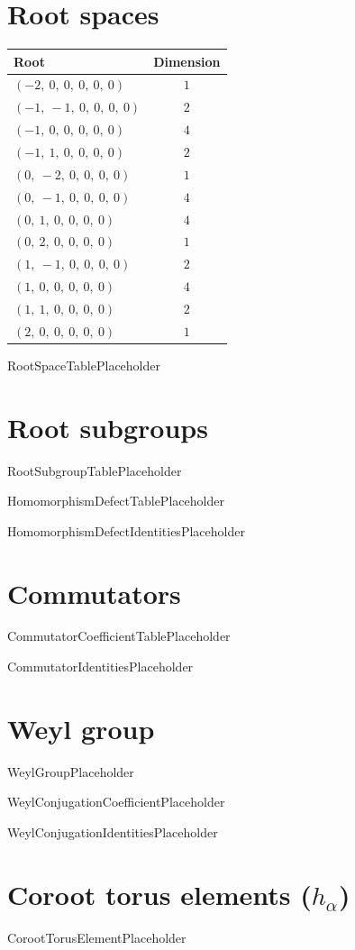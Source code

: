 \documentclass[11pt]{article}
\theoremstyle{definition}
\begin{document}
\section{Root spaces}

\begin{center}
\begin{tabular}{|l|c|}
\hline
Root & Dimension \\
\hline
$\left( -2, \  0, \  0, \  0, \  0, \  0\right)$ & $1$ \\
\hline
$\left( -1, \  -1, \  0, \  0, \  0, \  0\right)$ & $2$ \\
\hline
$\left( -1, \  0, \  0, \  0, \  0, \  0\right)$ & $4$ \\
\hline
$\left( -1, \  1, \  0, \  0, \  0, \  0\right)$ & $2$ \\
\hline
$\left( 0, \  -2, \  0, \  0, \  0, \  0\right)$ & $1$ \\
\hline
$\left( 0, \  -1, \  0, \  0, \  0, \  0\right)$ & $4$ \\
\hline
$\left( 0, \  1, \  0, \  0, \  0, \  0\right)$ & $4$ \\
\hline
$\left( 0, \  2, \  0, \  0, \  0, \  0\right)$ & $1$ \\
\hline
$\left( 1, \  -1, \  0, \  0, \  0, \  0\right)$ & $2$ \\
\hline
$\left( 1, \  0, \  0, \  0, \  0, \  0\right)$ & $4$ \\
\hline
$\left( 1, \  1, \  0, \  0, \  0, \  0\right)$ & $2$ \\
\hline
$\left( 2, \  0, \  0, \  0, \  0, \  0\right)$ & $1$ \\
\hline
\end{tabular}\end{center}

RootSpaceTablePlaceholder

\section{Root subgroups}

RootSubgroupTablePlaceholder

HomomorphismDefectTablePlaceholder

HomomorphismDefectIdentitiesPlaceholder

\section{Commutators}

CommutatorCoefficientTablePlaceholder

CommutatorIdentitiesPlaceholder

\section{Weyl group}

WeylGroupPlaceholder

WeylConjugationCoefficientPlaceholder

WeylConjugationIdentitiesPlaceholder

\section{Coroot torus elements ($h_\alpha$)}

CorootTorusElementPlaceholder
\end{document}
